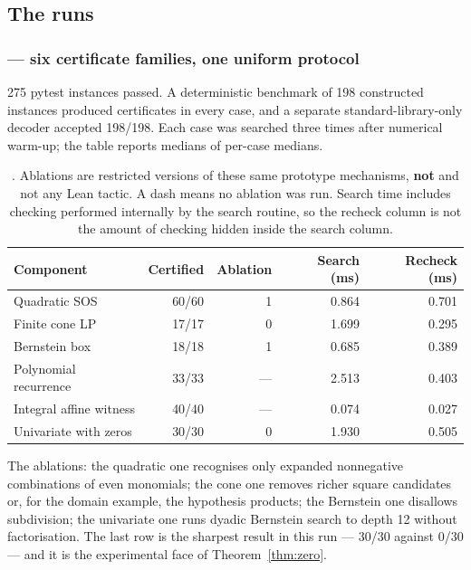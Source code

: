\subsection{The runs}

\subsubsection*{ --- six certificate families, one uniform protocol}

275 pytest instances passed. A deterministic benchmark of 198 constructed
instances produced certificates in every case, and a separate
standard-library-only decoder accepted 198/198. Each case was searched three
times after numerical warm-up; the table reports medians of per-case medians.

\begin{table}[htbp]
\centering\small
\begin{tabular}{@{}lrrrr@{}}
\toprule
Component & Certified & Ablation & Search (ms) & Recheck (ms) \\
\midrule
Quadratic SOS            & 60/60 & 1 & 0.864 & 0.701 \\
Finite cone LP           & 17/17 & 0 & 1.699 & 0.295 \\
Bernstein box            & 18/18 & 1 & 0.685 & 0.389 \\
Polynomial recurrence    & 33/33 & --- & 2.513 & 0.403 \\
Integral affine witness  & 40/40 & --- & 0.074 & 0.027 \\
Univariate with zeros    & 30/30 & 0 & 1.930 & 0.505 \\
\bottomrule
\end{tabular}
\caption{. Ablations are restricted versions of these same prototype
mechanisms, \textbf{not} \grind{} and not any Lean tactic. A dash means no
ablation was run. Search time includes checking performed internally by the
search routine, so the recheck column is not the amount of checking hidden
inside the search column.}
\label{tab:p1}
\end{table}

The ablations: the quadratic one recognises only expanded nonnegative
combinations of even monomials; the cone one removes richer square candidates
or, for the domain example, the hypothesis products; the Bernstein one disallows
subdivision; the univariate one runs dyadic Bernstein search to depth 12 without
factorisation. The last row is the sharpest result in this run --- 30/30 against
0/30 --- and it is the experimental face of Theorem~\ref{thm:zero}.

